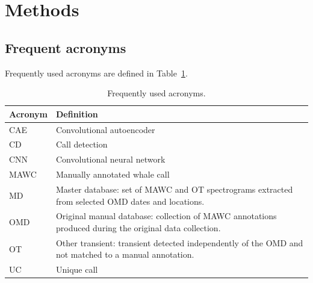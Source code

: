 \documentclass[preprint,NumberedRefs]{JASAnew}
\begin{document}


\section{\label{sec:Methods} Methods}

\subsection{Frequent acronyms}

Frequently used acronyms are defined in Table~\ref{tab:acronyms}.

\begin{table}[ht]
\caption{\label{tab:acronyms}Frequently used acronyms.}
\centering
\begin{ruledtabular}
\begin{tabular}{ll}
Acronym & Definition \\
\hline
CAE  & Convolutional autoencoder \\
CD   & Call detection \\
CNN  & Convolutional neural network \\
MAWC & Manually annotated whale call \\
MD   & \parbox[t]{0.72\textwidth}{Master database: set of MAWC and OT
       spectrograms extracted from selected OMD dates and locations.} \\[3pt]
OMD  & \parbox[t]{0.72\textwidth}{Original manual database: collection of MAWC annotations produced during the original data collection.} \\[3pt]
OT   & \parbox[t]{0.72\textwidth}{Other transient: transient detected
       independently of the OMD and not matched to a manual annotation.} \\[3pt]
UC   & Unique call
\end{tabular}
\end{ruledtabular}
\end{table}

\end{document}
